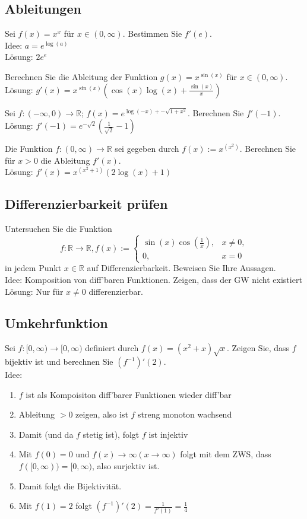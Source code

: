 \subsection{Ableitungen}
Sei $f(x) = x^x$ für $x \in (0,\infty)$.
Bestimmen Sie $f'(e)$.\\
Idee: $a = e^{\log(a)}$\\
Lösung: $2e^e$

Berechnen Sie die Ableitung der Funktion $g(x) = x^{\sin(x)}$ für $x \in (0,\infty)$.\\
Lösung: $g'(x) = x^{\sin(x)} \left(\cos(x)\log(x) + \frac{\sin(x)}{x}\right)$

Sei $f : (-\infty, 0) \to \mathbb{R}$; $f(x) = e^{\log(-x) + - \sqrt{1 + x^2}}$.
Berechnen Sie $f'(-1)$.\\
Lösung: $f'(-1) = e^{-\sqrt{2}}\left(\frac{1}{\sqrt{2}} - 1\right)$

Die Funktion $f:(0,\infty) \to \mathbb{R}$ sei gegeben durch $f(x) := x^{(x^2)}$.
Berechnen Sie für $x > 0$ die Ableitung $f'(x)$.\\
Lösung: $f'(x) = x^{(x^2 + 1)} (2\log(x) + 1)$

\subsection{Differenzierbarkeit prüfen}
Untersuchen Sie die Funktion
\begin{displaymath}
  f:\mathbb{R} \to \mathbb{R}, f(x) :=
  \begin{cases}
    \sin(x)\cos\left(\frac{1}{x}\right),& x \neq 0,\\
    0,& x = 0
  \end{cases}
\end{displaymath}
in jedem Punkt $x \in \mathbb{R}$ auf Differenzierbarkeit.
Beweisen Sie Ihre Aussagen.\\
Idee: Komposition von diff'baren Funktionen. Zeigen, dass der GW nicht existiert\\
Lösung: Nur für $x \neq 0$ differenzierbar.

\subsection{Umkehrfunktion}
Sei $f: [0,\infty) \to [0,\infty)$ definiert durch $f(x) = (x^2 + x)\sqrt{x}$.
Zeigen Sie, dass $f$ bijektiv ist und berechnen Sie $(f^{-1})'(2)$.\\
Idee:
\begin{enumerate}
    \item $f$ ist als Kompoisiton diff'barer Funktionen wieder diff'bar
    \item Ableitung $> 0$ zeigen, also ist $f$ streng monoton wachsend
    \item Damit (und da $f$ stetig ist), folgt $f$ ist injektiv
    \item Mit $f(0) = 0$ und $f(x) \to \infty (x \to \infty)$ folgt mit dem ZWS, dass $f([0,\infty)) = [0,\infty)$, also surjektiv ist.
    \item Damit folgt die Bijektivität.
    \item Mit $f(1) = 2$ folgt $(f^{-1})'(2) = \frac{1}{f'(1)} = \frac{1}{4}$
\end{enumerate}

